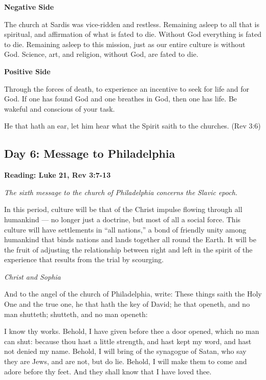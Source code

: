 \textbf{Negative Side}

The church at Sardis was vice-ridden and restless. Remaining asleep to all that is spiritual, and affirmation of what is
fated to die. Without God everything is fated to die. Remaining asleep to this mission, just as our entire culture is
without God. Science, art, and religion, without God, are fated to die.

\textbf{Positive Side}

Through the forces of death, to experience an incentive to seek for life and for God. If one has found God and one
breathes in God, then one has life. Be wakeful and conscious of your task.

He that hath an ear, let him hear what the Spirit saith to the churches. (Rev 3:6)

\subsection*{Day 6: Message to Philadelphia}
\textbf{Reading: Luke 21, Rev 3:7-13}

\emph{The sixth message to the church of Philadelphia concerns the Slavic epoch.}

\begin{quotationx}
In this period, culture will be that of the Christ impulse flowing through all humankind — no
longer just a doctrine, but most of all a social force. This culture will have settlements in “all nations,” a bond of
friendly unity among humankind that binds nations and lands together all round the Earth. It will be the fruit of
adjusting the relationship between right and left in the spirit of the experience that results from the trial by
scourging. \begin{flushright} \emph{Christ and Sophia}\end{flushright}

\end{quotationx}
And to the angel of the church of Philadelphia, write: These things saith the Holy One and the true one, he that hath
the key of David; he that openeth, and no man shutteth; shutteth, and no man openeth:

I know thy works. Behold, I have given before thee a door opened, which no man can shut: because thou hast a little
strength, and hast kept my word, and hast not denied my name. Behold, I will bring of the synagogue of Satan, who say
they are Jews, and are not, but do lie. Behold, I will make them to come and adore before thy feet. And they shall know
that I have loved thee.

